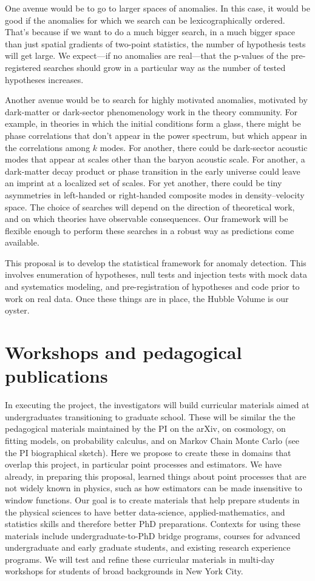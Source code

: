 \documentclass[12pt, fullpage, letterpaper]{article}
\begin{document}
One avenue would be to go to larger spaces of anomalies.
In this case, it would be good if the anomalies for which we search can be
lexicographically ordered.
That's because if we want to do a much bigger search, in a much bigger space
than just spatial gradients of two-point statistics, the number of hypothesis
tests will get large.
We expect---if no anomalies are real---that the p-values of the pre-registered searches should
grow in a particular way as the number of tested hypotheses increases.

Another avenue would be to search for highly motivated anomalies, motivated by dark-matter or dark-sector phenomenology work in the theory community.
For example, in theories in which the initial conditions form a glass, there might be phase correlations that don't appear in the power spectrum, but which appear in the correlations among $k$ modes.
For another, there could be dark-sector acoustic modes that appear at scales other than the baryon acoustic scale.
For another, a dark-matter decay product or phase transition in the early universe could leave an imprint at a localized set of scales.
For yet another, there could be tiny asymmetries in left-handed or right-handed composite modes in density--velocity space.
The choice of searches will depend on the direction of theoretical work, and on which theories have observable consequences.
Our framework will be flexible enough to perform these searches in a robust way as predictions come available.

This proposal is to develop the statistical framework for anomaly detection.
This involves enumeration of hypotheses,
null tests and injection tests with mock data and systematics modeling,
and pre-registration of hypotheses and code prior to work on real data.
Once these things are in place, the Hubble Volume is our oyster.

\section{Workshops and pedagogical publications}

In executing the project, the investigators will build curricular
materials aimed at undergraduates transitioning to graduate school.
These will be similar the the pedagogical materials maintained by
the PI on the arXiv, on cosmology, on fitting models, on probability
calculus, and on Markov Chain Monte Carlo (see the PI biographical sketch).
Here we propose to create these in domains that
overlap this project, in particular point processes and estimators.
We have already, in preparing this proposal, learned things about
point processes that are not widely known in physics, such as
how estimators can be made insensitive to window functions.
Our goal is to create materials that help prepare students
in the physical sciences to have better data-science, applied-mathematics, and statistics
skills and therefore better PhD preparations.
Contexts for using these materials include undergraduate-to-PhD bridge programs, courses for advanced undergraduate and early graduate students, and existing research experience programs. 
We will test and refine these curricular materials in multi-day workshops for
students of broad backgrounds in New York City.
\end{document}
